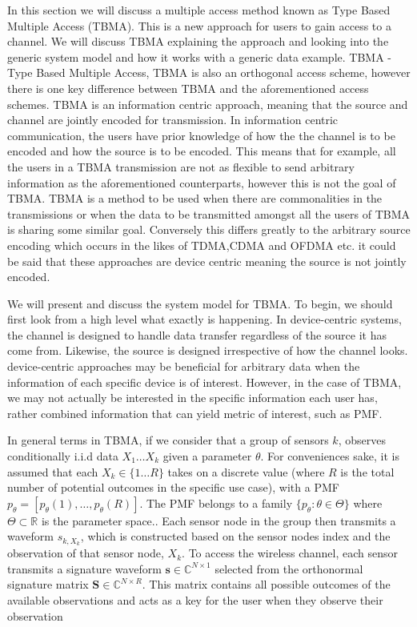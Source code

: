 \documentclass{article}
\begin{document}
In this section we will discuss a multiple access method known as Type Based Multiple Access (TBMA). This is a new approach for users to gain access to a channel. We will discuss TBMA explaining the approach and looking into the generic system model and how it works with a generic data example. 
TBMA - Type Based Multiple Access, TBMA is also an orthogonal access scheme, however there is one key difference between TBMA and the aforementioned access schemes. TBMA is an information centric approach, meaning that the source and channel are jointly encoded for transmission. In information centric communication, the users have prior knowledge of how the the channel is to be encoded and how the source is to be encoded. This means that for example, all the users in a TBMA transmission are not as flexible to send arbitrary information as the aforementioned counterparts, however this is not the goal of TBMA. TBMA is a method to be used when there are commonalities in the transmissions or when the data to be transmitted amongst all the users of TBMA is sharing some similar goal. Conversely this differs greatly to the arbitrary source encoding which occurs in the likes of TDMA,CDMA and OFDMA etc. it could be said that these approaches are device centric meaning the source is not jointly encoded. 

We will present and discuss the system model for TBMA. To begin, we should first look from a high level what exactly is happening. In device-centric systems, the channel is designed to handle data transfer regardless of the source it has come from. Likewise, the source is designed irrespective of how the channel looks. device-centric approaches may be beneficial for arbitrary data when the information of each specific device is of interest. However, in the case of TBMA, we may not actually be interested in the specific information each user has, rather combined information that can yield metric of interest, such as \ac{PMF}. 

In general terms in TBMA, if we consider that a group of sensors $k$, observes conditionally \ac{i.i.d} data $X_1 \dots X_k $ given a parameter $\theta$. For conveniences sake, it is assumed that each $X_k \in \{1 \dots R\}$ takes on a discrete value (where $R$ is the total number of potential outcomes in the specific use case), with a \ac{PMF}~${p_{\theta} = [p_{\theta}(1), \ldots, p_{\theta}(R)]}$. The \ac{PMF} belongs to a family $\{p_{\theta}: \theta \in \Theta\}$ where $\Theta \subset \mathbb{R}$ is the parameter space.. Each sensor node in the group then transmits a waveform $s_{k,X_k}$, which is constructed based on the sensor nodes index and the observation of that sensor node, $X_k$. To access the wireless channel, each sensor transmits a signature waveform $\boldsymbol{s} \in \mathbb{C}^{N \times 1}$ selected from the orthonormal signature matrix $\boldsymbol{S} \in \mathbb{C}^{N \times R}$. This matrix contains all possible outcomes of the available observations and acts as a key for the user when they observe their observation
\end{document}
